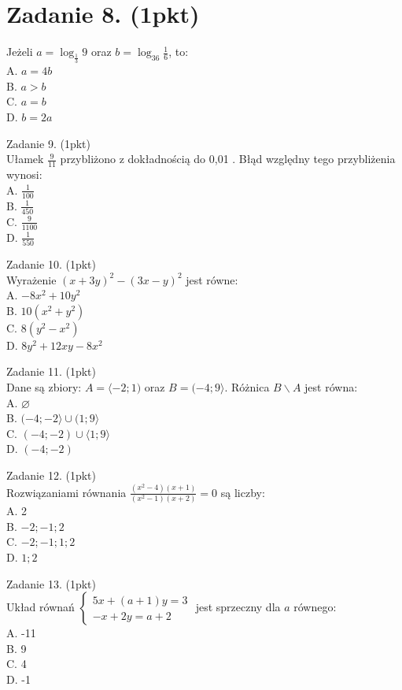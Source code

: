 \documentclass[10pt]{article}
\begin{document}
\section*{Zadanie 8. (1pkt)}
Jeżeli \(a=\log _{\frac{1}{3}} 9\) oraz \(b=\log _{36} \frac{1}{6}\), to:\\
A. \(a=4 b\)\\
B. \(a>b\)\\
C. \(a=b\)\\
D. \(b=2 a\)

Zadanie 9. (1pkt)\\
Ułamek \(\frac{9}{11}\) przybliżono z dokładnością do 0,01 . Błąd względny tego przybliżenia wynosi:\\
A. \(\frac{1}{100}\)\\
B. \(\frac{1}{450}\)\\
C. \(\frac{9}{1100}\)\\
D. \(\frac{1}{550}\)

Zadanie 10. (1pkt)\\
Wyrażenie \((x+3 y)^{2}-(3 x-y)^{2}\) jest równe:\\
A. \(-8 x^{2}+10 y^{2}\)\\
B. \(10\left(x^{2}+y^{2}\right)\)\\
C. \(8\left(y^{2}-x^{2}\right)\)\\
D. \(8 y^{2}+12 x y-8 x^{2}\)

Zadanie 11. (1pkt)\\
Dane są zbiory: \(A=\langle-2 ; 1)\) oraz \(B=(-4 ; 9\rangle\). Różnica \(B \backslash A\) jest równa:\\
A. \(\varnothing\)\\
B. \((-4 ;-2\rangle \cup(1 ; 9\rangle\)\\
C. \((-4 ;-2) \cup\langle 1 ; 9\rangle\)\\
D. \((-4 ;-2)\)

Zadanie 12. (1pkt)\\
Rozwiązaniami równania \(\frac{\left(x^{2}-4\right)(x+1)}{\left(x^{2}-1\right)(x+2)}=0\) są liczby:\\
A. 2\\
B. \(-2 ;-1 ; 2\)\\
C. \(-2 ;-1 ; 1 ; 2\)\\
D. \(1 ; 2\)

Zadanie 13. (1pkt)\\
Układ równań \(\left\{\begin{array}{c}5 x+(a+1) y=3 \\ -x+2 y=a+2\end{array}\right.\) jest sprzeczny dla \(a\) równego:\\
A. -11\\
B. 9\\
C. 4\\
D. -1
\end{document}
